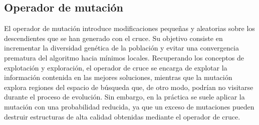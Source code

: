 \subsection{Operador de mutación}
\label{subsec:mutation}

El operador de mutación introduce modificaciones pequeñas y aleatorias sobre los descendientes que se han generado con el 
cruce. Su objetivo consiste en incrementar la diversidad genética de la población y evitar una convergencia prematura del 
algoritmo hacia mínimos locales. Recuperando los conceptos de explotación y exploración, el operador de cruce se encarga de 
explotar la información contenida en las mejores soluciones, mientras que la mutación explora regiones del espacio de búsqueda
que, de otro modo, podrían no visitarse durante el proceso de evolución. Sin embargo, en la práctica se suele aplicar la 
mutación con una probabilidad reducida, ya que un exceso de mutaciones pueden destruir estructuras de alta calidad obtenidas
mediante el operador de cruce.


